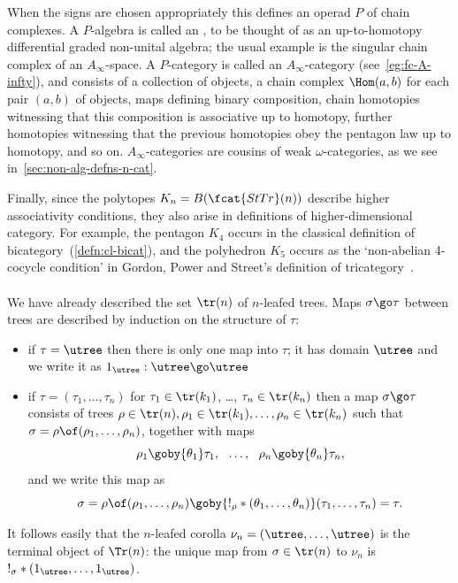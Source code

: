 When the signs are chosen appropriately this defines an operad $P$ of chain
complexes.  A $P$-algebra is called an ,%
%
%
to be thought of as an up-to-homotopy differential%
%
%
graded non-unital algebra; the
usual example is the singular chain complex of an $A_\infty$-space.  A
$P$-category is called an $A_\infty$-category%
%
%
%
%
(see~\ref{eg:fc-A-infty}), and consists of a collection of objects, a chain
complex $\Hom(a,b)$ for each pair $(a,b)$ of objects, maps defining binary
composition, chain homotopies witnessing that this composition is
associative up to homotopy, further homotopies witnessing that the previous
homotopies obey the pentagon law up to homotopy, and so on.
$A_\infty$-categories are cousins of weak $\omega$-categories, as we see
in~\ref{sec:non-alg-defns-n-cat}.

Finally, since the polytopes $K_n = B(\fcat{StTr}(n))$ describe higher
associativity%
%
%
conditions, they also arise in definitions of
higher-dimensional category.  For example, the pentagon%
%
%
$K_4$ occurs in the
classical definition of bicategory~(\ref{defn:cl-bicat}), and the
polyhedron $K_5$ occurs as the `non-abelian%
%
%
4-cocycle condition' in Gordon,%
%
%
Power and Street's definition of tricategory~\cite{GPS}.%
%
%

\paragraph*{}

We have already described the set $\tr(n)$ of $n$-leafed trees.  Maps
$\sigma \go \tau$ between trees are described by induction on the structure
of $\tau$:
%
\begin{itemize}
\item if $\tau=\utree$ then there is only one map into $\tau$; it has
domain $\utree$ and we write it as $1_\utree: \utree \go \utree$
\item if $\tau = (\tau_1, \ldots, \tau_n)$ for $\tau_1 \in \tr(k_1)$,
\ldots, $\tau_n \in \tr(k_n)$ then a map $\sigma \go \tau$ consists of
trees $\rho \in \tr(n), \rho_1 \in \tr(k_1), \ldots, \rho_n \in \tr(k_n)$
such that $\sigma = \rho \of (\rho_1, \ldots, \rho_n)$, together with maps
\[
\rho_1 \goby{\theta_1} \tau_1, 
\ \ \ldots,\ \  
\rho_n \goby{\theta_n} \tau_n,
\]
and we write this map as
%
\begin{equation}	\label{eq:form-of-map-of-trees}
\sigma = \rho \of (\rho_1, \ldots, \rho_n)
\goby{!_\rho * (\theta_1, \ldots, \theta_n)}
(\tau_1, \ldots, \tau_n) = \tau.
\end{equation}
% 
\end{itemize}
%
It follows easily that the $n$-leafed corolla $\nu_n = (\utree, \ldots,
\utree)$ is the terminal object of $\Tr(n)$: the unique map from
$\sigma\in\tr(n)$ to $\nu_n$ is $!_\sigma * (1_\utree, \ldots, 1_\utree)$.

